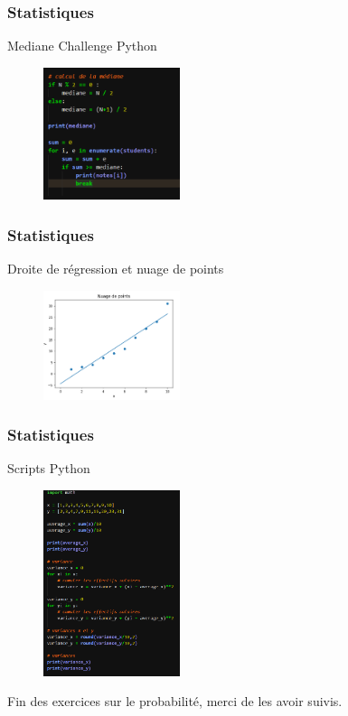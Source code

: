 \documentclass{beamer}
\begin{document}
\begin{frame} %
  \frametitle{Statistiques}
  \begin{exercice}[2.2]
   Mediane Challenge Python
    \begin{figure}[!h]
      \includegraphics[width=4cm]{../Images/stat_exo23_corr}
  \end{figure} 
  \end{exercice}

\end{frame}

\begin{frame} %
  \frametitle{Statistiques}
  \begin{exercice}[3.1]
    Droite de régression et nuage de points
    \begin{figure}[!h]
      \includegraphics[width=4cm]{../Images/stat_exo33_corr}
  \end{figure}
  \end{exercice}

\end{frame}

\begin{frame} %
  \frametitle{Statistiques}
  \begin{exercice}[3.2]
      Scripts Python
      \begin{figure}[!h]
        \includegraphics[width=4cm]{../Images/stat_exo32_corr}
    \end{figure}
  \end{exercice}

\end{frame}


\begin{frame} %
 Fin des exercices sur le probabilité, merci de les avoir suivis.
\end{frame}
  
\end{document}
